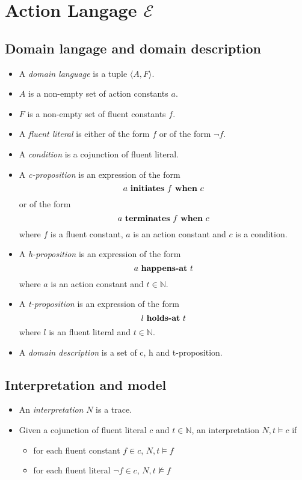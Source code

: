 \section{Action Langage $\mathcal{E}$}\label{sec:e}

\theoremstyle{definition}
\newtheorem{definition}{Definition}[section]

\subsection{Domain langage and domain description}

\begin{itemize}
  \item A \emph{domain language} is a tuple $\langle A,F\rangle$.
  \item $A$ is a non-empty set of action constants $a$.
  \item $F$ is a non-empty set of fluent constants $f$.
  \item A \emph{fluent literal} is either of the form $f$ or of the form $\neg f$.
  \item A \emph{condition} is a cojunction of fluent literal.
  \item A \emph{c-proposition} is an expression of the form
    $$a \text{ \textbf{initiates} } f \text{  \textbf{when} } c$$
    or of the form
    $$a \text{ \textbf{terminates} } f \text{  \textbf{when} } c$$
    where $f$ is a fluent constant, $a$ is an action constant and $c$ is a condition.
  \item A \emph{h-proposition} is an expression of the form
    $$a \text{  \textbf{happens-at} } t$$
    where $a$ is an action constant and $t \in \mathbb{N}$.
  \item A \emph{t-proposition} is an expression of the form
    $$l \text{  \textbf{holds-at} } t$$
    where $l$ is an fluent literal and $t \in \mathbb{N}$.
  \item A \emph{domain description} is a set of c, h and t-proposition.
\end{itemize}

\subsection{Interpretation and model}

\begin{itemize}
  \item An \emph{interpretation} $N$ is a trace.
  \item Given a cojunction of fluent literal $c$ and $t \in \mathbb{N}$, an interpretation $N,t \vDash c$ if
    \begin{itemize}
      \item for each fluent constant $f\in c$, $N,t \vDash f$
      \item for each fluent literal $\neg f\in c$, $N,t \nvDash f$
    \end{itemize}
\end{itemize}


